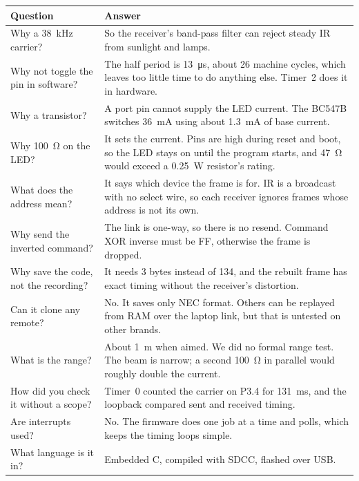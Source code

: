 \documentclass[11pt,a4paper]{article}
\begin{document}
\small
\begin{tabularx}{\textwidth}{@{}>{\raggedright\arraybackslash}p{5cm} L@{}}
\toprule
Question & Answer\\
\midrule
Why a \qty{38}{\kilo\hertz} carrier? & So the receiver's band-pass filter can reject steady IR from sunlight and lamps.\\
Why not toggle the pin in software? & The half period is \qty{13}{\micro\second}, about 26 machine cycles, which leaves too little time to do anything else. Timer~2 does it in hardware.\\
Why a transistor? & A port pin cannot supply the LED current. The BC547B switches \qty{36}{\milli\ampere} using about \qty{1.3}{\milli\ampere} of base current.\\
Why \qty{100}{\ohm} on the LED? & It sets the current. Pins are high during reset and boot, so the LED stays on until the program starts, and \qty{47}{\ohm} would exceed a \qty{0.25}{\watt} resistor's rating.\\
What does the address mean? & It says which device the frame is for. IR is a broadcast with no select wire, so each receiver ignores frames whose address is not its own.\\
Why send the inverted command? & The link is one-way, so there is no resend. Command XOR inverse must be FF, otherwise the frame is dropped.\\
Why save the code, not the recording? & It needs 3 bytes instead of 134, and the rebuilt frame has exact timing without the receiver's distortion.\\
Can it clone any remote? & No. It saves only NEC format. Others can be replayed from RAM over the laptop link, but that is untested on other brands.\\
What is the range? & About \qty{1}{\metre} when aimed. We did no formal range test. The beam is narrow; a second \qty{100}{\ohm} in parallel would roughly double the current.\\
How did you check it without a scope? & Timer~0 counted the carrier on P3.4 for \qty{131}{\milli\second}, and the loopback compared sent and received timing.\\
Are interrupts used? & No. The firmware does one job at a time and polls, which keeps the timing loops simple.\\
What language is it in? & Embedded C, compiled with SDCC, flashed over USB.\\
\bottomrule
\end{tabularx}
\end{document}
